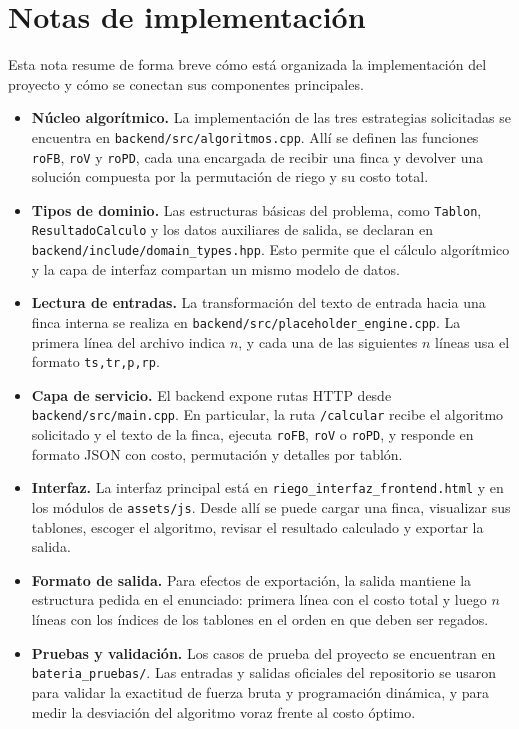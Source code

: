 \documentclass[12pt,a4paper]{article}
\begin{document}
\appendix

\section*{Notas de implementaci\'on}

Esta nota resume de forma breve c\'omo est\'a organizada la implementaci\'on del proyecto y c\'omo se conectan sus componentes principales.

\begin{itemize}
  \item \textbf{N\'ucleo algor\'itmico.} La implementaci\'on de las tres estrategias solicitadas se encuentra en \texttt{backend/src/algoritmos.cpp}. All\'i se definen las funciones \texttt{roFB}, \texttt{roV} y \texttt{roPD}, cada una encargada de recibir una finca y devolver una soluci\'on compuesta por la permutaci\'on de riego y su costo total.
  \item \textbf{Tipos de dominio.} Las estructuras b\'asicas del problema, como \texttt{Tablon}, \texttt{ResultadoCalculo} y los datos auxiliares de salida, se declaran en \texttt{backend/include/domain\_types.hpp}. Esto permite que el c\'alculo algor\'itmico y la capa de interfaz compartan un mismo modelo de datos.
  \item \textbf{Lectura de entradas.} La transformaci\'on del texto de entrada hacia una finca interna se realiza en \texttt{backend/src/placeholder\_engine.cpp}. La primera l\'inea del archivo indica \(n\), y cada una de las siguientes \(n\) l\'ineas usa el formato \texttt{ts,tr,p,rp}.
  \item \textbf{Capa de servicio.} El backend expone rutas HTTP desde \texttt{backend/src/main.cpp}. En particular, la ruta \texttt{/calcular} recibe el algoritmo solicitado y el texto de la finca, ejecuta \texttt{roFB}, \texttt{roV} o \texttt{roPD}, y responde en formato JSON con costo, permutaci\'on y detalles por tabl\'on.
  \item \textbf{Interfaz.} La interfaz principal est\'a en \texttt{riego\_interfaz\_frontend.html} y en los m\'odulos de \texttt{assets/js}. Desde all\'i se puede cargar una finca, visualizar sus tablones, escoger el algoritmo, revisar el resultado calculado y exportar la salida.
  \item \textbf{Formato de salida.} Para efectos de exportaci\'on, la salida mantiene la estructura pedida en el enunciado: primera l\'inea con el costo total y luego \(n\) l\'ineas con los \'indices de los tablones en el orden en que deben ser regados.
  \item \textbf{Pruebas y validaci\'on.} Los casos de prueba del proyecto se encuentran en \texttt{bateria\_pruebas/}. Las entradas y salidas oficiales del repositorio se usaron para validar la exactitud de fuerza bruta y programaci\'on din\'amica, y para medir la desviaci\'on del algoritmo voraz frente al costo \'optimo.
\end{itemize}
\end{document}
